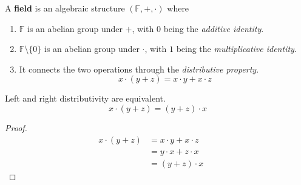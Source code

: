  \begin{definition}[Ring]
    
  \end{definition}

  \begin{definition}[Field]
    A \textbf{field} is an algebraic structure $(\mathbb{F}, +, \cdot)$ where 
    \begin{enumerate}
      \item $\mathbb{F}$ is an abelian group under $+$, with $0$ being the \textit{additive identity}. 
      \item $\mathbb{F} \setminus \{0\}$ is an abelian group under $\cdot$, with $1$ being the \textit{multiplicative identity}. 
      \item It connects the two operations through the \textit{distributive property}.
      \begin{equation}
        x \cdot (y + z) = x \cdot y + x \cdot z
      \end{equation}
    \end{enumerate}
  \end{definition} 

  \begin{lemma}[Left = Right Distributivity]
    Left and right distributivity are equivalent. 
    \begin{equation}
      x \cdot (y + z) = (y + z) \cdot x
    \end{equation}
  \end{lemma} 
  \begin{proof}
    \begin{align}
      x \cdot (y + z) & = x \cdot y + x \cdot z && \tag{Distributive} \\
                      & = y \cdot x + z \cdot x && \tag{Commutative} \\
                      & = (y + z) \cdot x && \tag{Distributive} 
    \end{align}
  \end{proof} 

